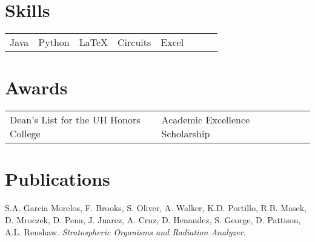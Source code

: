 \documentclass{cv_class}
\begin{document}
    
\section{Skills}
\begin{tabular}{l l l l l l l l}
  Java & Python & \LaTeX & Circuits & Excel
\end{tabular}

\section{Awards}
\begin{tabular}{l l l l}
  Dean's List for the UH Honors College & Academic Excellence Scholarship
\end{tabular}

\section{Publications}
\begin{enumerate}[\hspace{1cm}{[1]}]
\item{S.A. Garcia Morelos, F. Brooks, S. Oliver, A. Walker, K.D. Portillo, R.B. Masek, D. Mroczek, D. Pena, J. Juarez,
A. Cruz, D. Henandez, S. George, D. Pattison, A.L. Renshaw. \textit{Stratospheric Organisms and Radiation Analyzer}.}
\end{enumerate}
\end{document}
